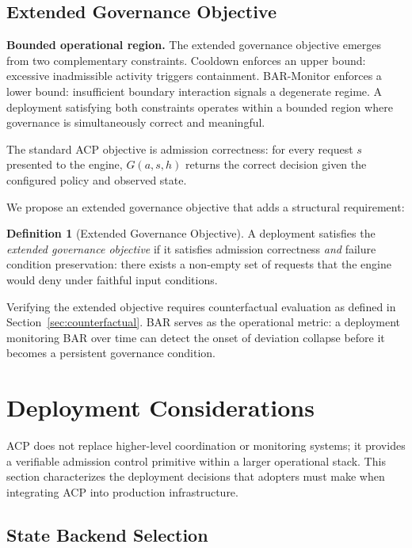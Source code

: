 \documentclass[11pt]{article}
\theoremstyle{definition}
\newtheorem{definition}{Definition}
\begin{document}
\subsection{Extended Governance Objective}

\textbf{Bounded operational region.}
The extended governance objective emerges from two complementary constraints.
Cooldown enforces an upper bound: excessive inadmissible activity triggers
containment.
BAR-Monitor enforces a lower bound: insufficient boundary interaction signals
a degenerate regime.
A deployment satisfying both constraints operates within a bounded region
where governance is simultaneously correct and meaningful.

The standard ACP objective is admission correctness: for every request $s$
presented to the engine, $G(a, s, h)$ returns the correct decision given
the configured policy and observed state.

We propose an extended governance objective that adds a structural requirement:

\begin{definition}[Extended Governance Objective]
A deployment satisfies the \emph{extended governance objective} if it satisfies
admission correctness \emph{and} failure condition preservation: there exists a
non-empty set of requests that the engine would deny under faithful input conditions.
\end{definition}

Verifying the extended objective requires counterfactual evaluation as defined in
Section~\ref{sec:counterfactual}.
BAR serves as the operational metric: a deployment monitoring BAR over time
can detect the onset of deviation collapse before it becomes a persistent
governance condition.

\section{Deployment Considerations}
\label{sec:deployment}

ACP does not replace higher-level coordination or monitoring systems;
it provides a verifiable admission control primitive within a larger operational stack.
This section characterizes the deployment decisions that adopters must make
when integrating ACP into production infrastructure.

\subsection{State Backend Selection}
\end{document}
